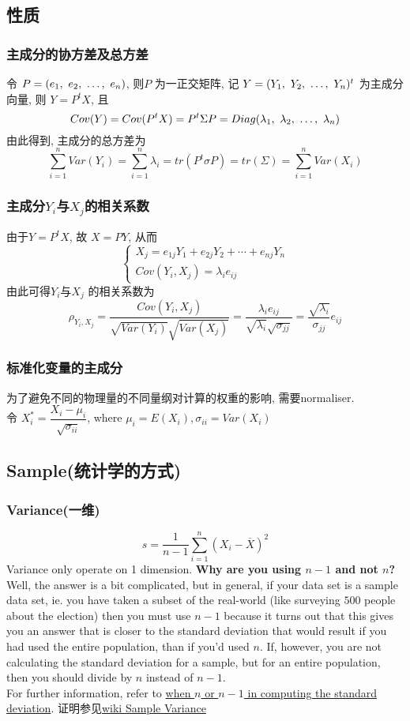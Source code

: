 \documentclass{article}
\begin{document}
\subsection{性质}
\subsubsection{主成分的协方差及总方差}
令 $P = (e_1,~e_2,~\ldots,~e_n)$, 则$P$ 为一正交矩阵, 记 $Y=(Y_1,~Y_2,~\ldots,~Y_n)^t$ 为主成分向量, 则 $Y=P^t X$, 且
$$
Cov(Y) = Cov(P^t X) = P^t \Sigma P = Diag (\lambda_1,~\lambda_2,~\ldots,~\lambda_n)
$$
由此得到, 主成分的总方差为
$$
\sum_{i=1}^n Var(Y_i) = \sum_{i=1}^n \lambda_i = tr(P^t \sigma P) = tr(\Sigma) = \sum_{i=1}^n Var(X_i)
$$

\subsubsection{主成分$Y_i$与$X_j$的相关系数}
由于$Y=P^t X$, 故 $X=PY$, 从而
$$
\left\{
  \begin{array}{l}
		  X_j = e_{1j}Y_1 + e_{2j}Y_2 + \cdots + e_{nj}Y_n \\
		  Cov(Y_i,X_j) = \lambda_i e_{ij}
  \end{array}
\right.
$$
由此可得$Y_i$与$X_j$ 的相关系数为
$$
\rho_{Y_i,X_j} = \frac{Cov(Y_i,X_j)}{\sqrt{Var(Y_i)} \sqrt{Var(X_j)}} = \frac{\lambda_i e_{ij}}{\sqrt{\lambda_i} \sqrt{\sigma_{jj}}} = \frac{\sqrt{\lambda_i}}{\sigma_{jj}} e_{ij}
$$

\subsubsection{标准化变量的主成分}
为了避免不同的物理量的不同量纲对计算的权重的影响, 需要normaliser.\\
令 $X_i^* = \dfrac{X_i - \mu_i}{\sqrt{\sigma_{ii}}}$, where $\mu_i = E(X_i), \sigma_{ii} = Var(X_i)$

\subsection{Sample(统计学的方式)}
\subsubsection{Variance(一维)}
$$
s = \dfrac{1}{n-1} \sum_{i=1}^n (X_i - \overline{X})^2
$$
Variance only operate on 1 dimension.
\textbf{Why are you using $n-1$ and not $n$?}\\
Well, the answer is a bit complicated, but in general, if your data set is a sample data set,
ie. you have taken a subset of the real-world (like surveying $500$ people about the election) then you must use $n-1$
because it turns out that this gives you an answer that is closer to the standard deviation that would result if you had used the entire population, than if you'd used $n$.
If, however, you are not calculating the standard deviation for a sample, but for an entire population, then you should divide by $n$ instead of $n-1$.\\
For further information, refer to \href{http://mathcentral.uregina.ca/RR/database/RR.09.95/weston2.html}{when $n$ or $n-1$ in computing the standard deviation}. 证明参见\href{http://en.wikipedia.org/wiki/Unbiased\_estimator#Sample\_variance}{wiki Sample Variance}
\end{document}
